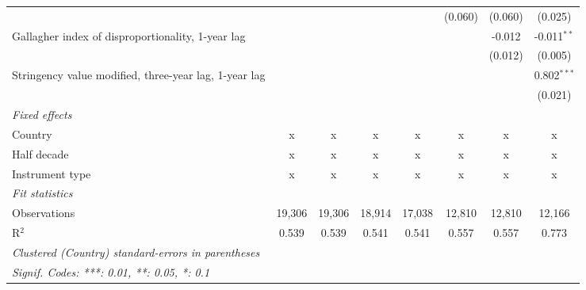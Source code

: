 \begin{table}[htbp]
\begin{tabular}{lccccccc}
                                                            &               &               &              &              & (0.060)       & (0.060)       & (0.025)\\   
      Gallagher index of disproportionality, 1-year lag     &               &               &              &              &               & -0.012        & -0.011$^{**}$\\   
                                                            &               &               &              &              &               & (0.012)       & (0.005)\\   
      Stringency value modified, three-year lag, 1-year lag &               &               &              &              &               &               & 0.802$^{***}$\\   
                                                            &               &               &              &              &               &               & (0.021)\\   
      \emph{Fixed effects}\\
      Country                                               & x             & x             & x            & x            & x             & x             & x\\  
      Half decade                                           & x             & x             & x            & x            & x             & x             & x\\  
      Instrument type                                       & x             & x             & x            & x            & x             & x             & x\\  
      \midrule \emph{Fit statistics}\\
      Observations                                          & 19,306        & 19,306        & 18,914       & 17,038       & 12,810        & 12,810        & 12,166\\  
      R$^2$                                                 & 0.539         & 0.539         & 0.541        & 0.541        & 0.557         & 0.557         & 0.773\\  
      \midrule
      \multicolumn{8}{l}{\emph{Clustered (Country) standard-errors in parentheses}}\\
      \multicolumn{8}{l}{\emph{Signif. Codes: ***: 0.01, **: 0.05, *: 0.1}}\\
   \end{tabular}
\end{table}


